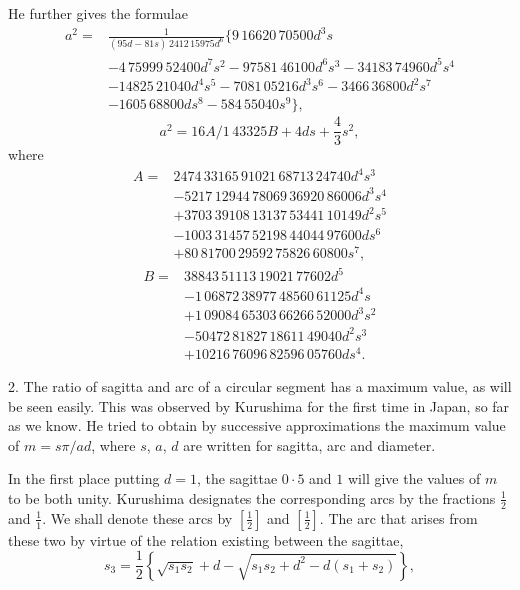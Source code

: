 \documentclass[11pt]{article}
\newcommand{\scanfooter}{}
\newcommand{\dd}{\mathbin{\cdot}}
\begin{document}
He further gives the formulae
\[
\begin{aligned}
a^2={}&\frac1{(95d-81s)\,2412\,15975d^6}\{9\,16620\,70500d^3s\\
&-4\,75999\,52400d^7s^2-97581\,46100d^6s^3-34183\,74960d^5s^4\\
&-14825\,21040d^4s^5-7081\,05216d^3s^6-3466\,36800d^2s^7\\
&-1605\,68800ds^8-584\,55040s^9\},
\end{aligned}
\]
\[
a^2=16A/1\,43325B+4ds+\frac43s^2,
\]
where
\[
\begin{aligned}
A={}&2474\,33165\,91021\,68713\,24740d^4s^3\\
&-5217\,12944\,78069\,36920\,86006d^3s^4\\
&+3703\,39108\,13137\,53441\,10149d^2s^5\\
&-1003\,31457\,52198\,44044\,97600ds^6\\
&+80\,81700\,29592\,75826\,60800s^7,
\end{aligned}
\]
\[
\begin{aligned}
B={}&38843\,51113\,19021\,77602d^5\\
&-1\,06872\,38977\,48560\,61125d^4s\\
&+1\,09084\,65303\,66266\,52000d^3s^2\\
&-50472\,81827\,18611\,49040d^2s^3\\
&+10216\,76096\,82596\,05760ds^4.
\end{aligned}
\]

2. The ratio of sagitta and arc of a circular segment has a maximum value, as will be seen easily. This was observed by Kurushima for the first time in Japan, so far as we know. He tried to obtain by successive approximations the maximum value of $m=s\pi/ad$, where $s$, $a$, $d$ are written for sagitta, arc and diameter.

In the first place putting $d=1$, the sagittae $0\dd5$ and $1$ will give the values of $m$ to be both unity. Kurushima designates the corresponding arcs by the fractions $\frac12$ and $\frac11$. We shall denote these arcs by $\left[\frac12\right]$ and $\left[\frac12\right]$. The arc that arises from these two by virtue of the relation existing between the sagittae,
\[
s_3=\frac12\left\{\sqrt{s_1s_2}+d-\sqrt{s_1s_2+d^2-d(s_1+s_2)}\right\},
\]
\scanfooter
\end{document}
